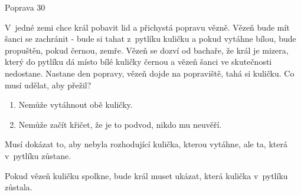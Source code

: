 Poprava
30 %

V~jedné zemi chce král pobavit lid a přichystá popravu vězně. Vězeň bude mít šanci se zachránit - bude si tahat z~pytlíku kuličku a pokud vytáhne bílou, bude propuštěn, pokud černou, zemře. Vězeň se dozví od bachaře, že král je mizera, který do pytlíku dá místo bílé kuličky černou a vězeň šanci ve skutečnosti nedostane. Nastane den popravy, vězeň dojde na popraviště, tahá si kuličku. Co musí udělat, aby přežil?

\begin{enumerate}
\item Nemůže vytáhnout obě kuličky.
\item Nemůže začít křičet, že je to podvod, nikdo mu neuvěří.
\end{enumerate}

Musí dokázat to, aby nebyla rozhodující kulička, kterou vytáhne, ale ta, která v~pytlíku zůstane.

Pokud vězeň kuličku spolkne, bude král muset ukázat, která kulička v~pytlíku zůstala.

